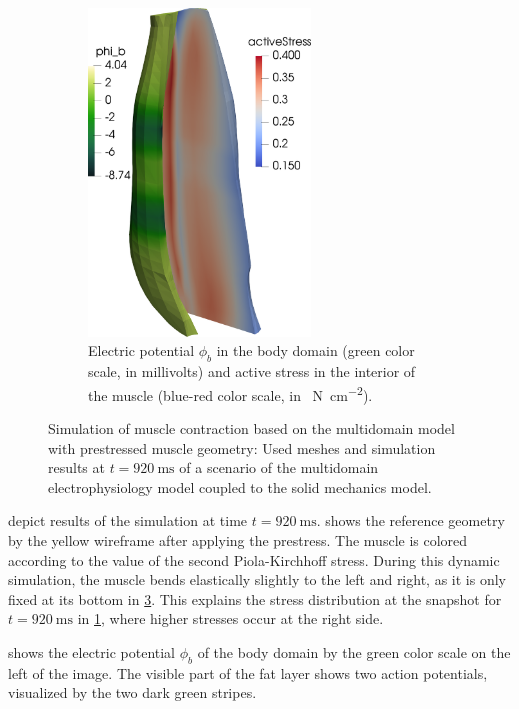 \begin{figure}
\begin{subfigure}[t]{0.31\textwidth}
    \label{fig:multidomain_prestretch6}%
  \end{subfigure}\qquad
  \begin{subfigure}[t]{0.31\textwidth}%
    \centering%
    \includegraphics[height=87mm]{images/results/application/multidomain_prestretch2.png}%
    \caption{Electric potential $\phi_b$ in the body domain (green color scale, in millivolts) and active stress in the interior of the muscle (blue-red color scale, in \SI{}{\newton\per\centi\meter\squared}).}%
    \label{fig:multidomain_prestretch2}%
  \end{subfigure}
  \hfill
  \caption{Simulation of muscle contraction based on the multidomain model with prestressed muscle geometry: Used meshes and simulation results at $t=\SI{920}{\ms}$ of a scenario of the multidomain electrophysiology model coupled to the solid mechanics model.}%
  \label{fig:multidomain_prestretch}%
\end{figure}%

 depict results of the simulation at time $t=\SI{920}{\milli\second}$. 
 shows the reference geometry by the yellow wireframe after applying the prestress. The muscle is colored according to the value of the second Piola-Kirchhoff stress. During this dynamic simulation, the muscle bends elastically slightly to the left and right, as it is only fixed at its bottom in \cref{fig:multidomain_prestretch}. This explains the stress distribution at the snapshot for $t=\SI{920}{\milli\second}$ in \cref{fig:multidomain_prestretch6}, where higher stresses occur at the right side.

 shows the electric potential $\phi_b$ of the body domain by the green color scale on the left of the image. The visible part of the fat layer shows two action potentials, visualized by the two dark green stripes.

